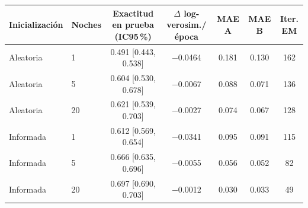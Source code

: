 \begin{tabular}{llccccc}
\toprule
\textbf{Inicialización} & \textbf{Noches} & \textbf{Exactitud en prueba (IC95\,\%)} & \textbf{$\Delta$ log-verosim./época} & \textbf{MAE $\mathbf{A}$} & \textbf{MAE $\mathbf{B}$} & \textbf{Iter. EM} \\
\midrule
Aleatoria & 1 & 0.491 {\scriptsize [0.443, 0.538]} & \ensuremath{-}0.0464 & 0.181 & 0.130 & 162 \\
Aleatoria & 5 & 0.604 {\scriptsize [0.530, 0.678]} & \ensuremath{-}0.0067 & 0.088 & 0.071 & 136 \\
Aleatoria & 20 & 0.621 {\scriptsize [0.539, 0.703]} & \ensuremath{-}0.0027 & 0.074 & 0.067 & 128 \\
Informada & 1 & 0.612 {\scriptsize [0.569, 0.654]} & \ensuremath{-}0.0341 & 0.095 & 0.091 & 115 \\
Informada & 5 & 0.666 {\scriptsize [0.635, 0.696]} & \ensuremath{-}0.0055 & 0.056 & 0.052 & 82 \\
Informada & 20 & 0.697 {\scriptsize [0.690, 0.703]} & \ensuremath{-}0.0012 & 0.030 & 0.033 & 49 \\
\bottomrule
\end{tabular}
